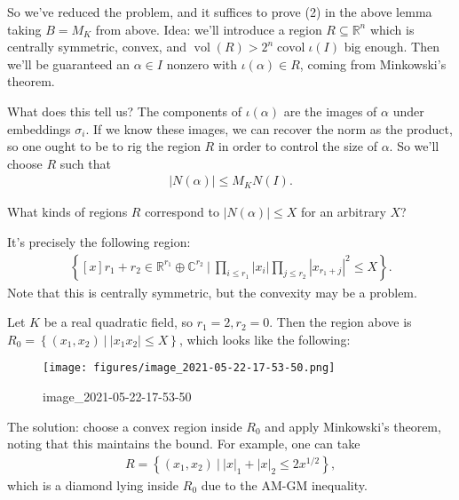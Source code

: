 \begin{remark}

So we've reduced the problem, and it suffices to prove (2) in the above
lemma taking \(B = M_K\) from above. Idea: we'll introduce a region
\(R \subseteq {\mathbb{R}}^n\) which is centrally symmetric, convex, and
\(\operatorname{vol}(R) > 2^n \operatorname{covol}\iota(I)\) big enough.
Then we'll be guaranteed an \(\alpha \in I\) nonzero with
\(\iota( \alpha)\in R\), coming from Minkowski's theorem.

What does this tell us? The components of \(\iota( \alpha)\) are the
images of \(\alpha\) under embeddings \(\sigma_i\). If we know these
images, we can recover the norm as the product, so one ought to be to
rig the region \(R\) in order to control the size of \(\alpha\). So
we'll choose \(R\) such that
\begin{align*}
{\left\lvert { N( \alpha)} \right\rvert} \leq M_K N(I)
.\end{align*}

\end{remark}

\begin{question}

What kinds of regions \(R\) correspond to
\({\left\lvert {N( \alpha)} \right\rvert} \leq X\) for an arbitrary
\(X\)?

\end{question}

\begin{answer}

It's precisely the following region:
\begin{align*}
\left\{{ {\left[ {x} \right]}{r_1 + r_2} \in {\mathbb{R}}^{r_1} \oplus {\mathbb{C}}^{r_2} {~\mathrel{\Big|}~}\prod_{i\leq r_1} {\left\lvert {x_i} \right\rvert} \prod_{j\leq r_2} {\left\lvert {x_{r_1 + j}} \right\rvert}^2 \leq X }\right\} 
.\end{align*}
Note that this is centrally symmetric, but the convexity may be a
problem.

\end{answer}

\begin{example}[?]

Let \(K\) be a real quadratic field, so \(r_1 = 2, r_2 = 0\). Then the
region above is
\(R_0 = \left\{{ (x_1, x_2) {~\mathrel{\Big|}~}{\left\lvert {x_1 x_2} \right\rvert} \leq X }\right\}\),
which looks like the following:

\begin{figure}
\centering
\texttt{[image: figures/image\_2021-05-22-17-53-50.png]}
\caption{image\_2021-05-22-17-53-50}
\end{figure}

The solution: choose a convex region inside \(R_0\) and apply
Minkowski's theorem, noting that this maintains the bound. For example,
one can take
\begin{align*}
R = \left\{{ (x_1, x_2) {~\mathrel{\Big|}~}{\left\lvert {x} \right\rvert}_1 + {\left\lvert {x} \right\rvert}_2 \leq 2x^{1/2} }\right\} 
,\end{align*}
which is a diamond lying inside \(R_0\) due to the AM-GM inequality.

\end{example}

